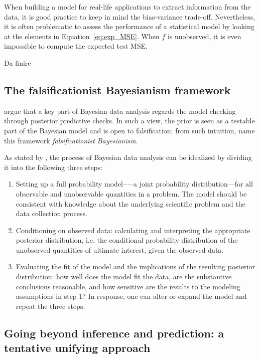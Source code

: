 \documentclass{statsoc}
\begin{document}
When building a model for real-life applications to extract information from the data, it is good practice to keep in mind the bias-variance trade-off. Nevertheless, it is often 
problematic to assess the performance of a statistical model by looking at the elements in Equation~\eqref{eq:exp_MSE}. When $f$ is unobserved, it is even impossible to compute the expected test MSE.

\color{blue}

Da finire


\color{black}


\subsection{The falsificationist Bayesianism framework}

\cite{gelman2013philosophy} argue that a key part of Bayesian data analysis regards the model checking through posterior predictive checks. In such a view, the prior is seen as a testable part of the Bayesian model and is open to falsification: from such intuition, \cite{gelman2017beyond} name this framework \emph{falsificationist Bayesianism}.

As stated by \cite{gelman2013bayesian}, the process of Bayesian data analysis can be idealized by dividing it into the following three steps:

\begin{enumerate}
\item Setting up a full probability model—--a joint probability distribution---for all observable and unobservable quantities 
           in a problem. The model should be consistent with knowledge about the underlying scientific problem and the data collection 
           process.
\item Conditioning on observed data: calculating and interpreting the appropriate posterior distribution, i.e. the conditional probability 
           distribution of the unobserved quantities of ultimate interest, given the observed data.
\item Evaluating the fit of the model and the implications of the resulting posterior distribution: how well does the model fit the 
           data, are the substantive conclusions reasonable, and how sensitive are the results to the modeling assumptions in step 1? 
           In response, one can alter or expand the model and repeat the three steps.
\end{enumerate}
%

\subsection{Going beyond inference and prediction: a tentative unifying approach}
\end{document}
